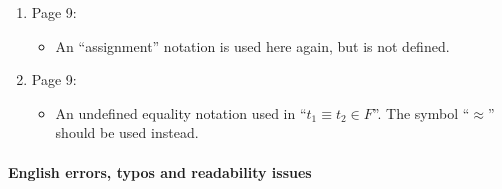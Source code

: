 \begin{enumerate}
	\item Page 9:
	\begin{itemize}
		\item An ``assignment'' notation is used here again, but is not defined.
	\end{itemize}

	\item Page 9:
	\begin{itemize}
		\item An undefined equality notation used in ``$t_1 \equiv t_2 \in F$''. The symbol ``$\approx$'' should be used instead.
	\end{itemize}
\end{enumerate}


\clearpage
\paragraph{English errors, typos and readability issues}
\mbox{}


